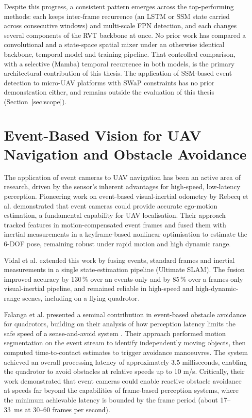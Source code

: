 \documentclass[11pt, a4paper]{report}
\begin{document}
Despite this progress, a consistent pattern emerges across the top-performing methods: each keeps inter-frame recurrence (an LSTM or SSM state carried across consecutive windows) and multi-scale FPN detection, and each changes several components of the RVT backbone at once. No prior work has compared a convolutional and a state-space spatial mixer under an otherwise identical backbone, temporal model and training pipeline. That controlled comparison, with a selective (Mamba) temporal recurrence in both models, is the primary architectural contribution of this thesis. The application of SSM-based event detection to micro-UAV platforms with SWaP constraints has no prior demonstration either, and remains outside the evaluation of this thesis (Section~\ref{sec:scope}).

\section{Event-Based Vision for UAV Navigation and Obstacle Avoidance}
The application of event cameras to UAV navigation has been an active area of research, driven by the sensor's inherent advantages for high-speed, low-latency perception. Pioneering work on event-based visual-inertial odometry by Rebecq et al. \cite{rebecq2017real} demonstrated that event cameras could provide accurate ego-motion estimation, a fundamental capability for UAV localisation. Their approach tracked features in motion-compensated event frames and fused them with inertial measurements in a keyframe-based nonlinear optimisation to estimate the 6-DOF pose, remaining robust under rapid motion and high dynamic range. 

Vidal et al. \cite{vidal2018ultimate} extended this work by fusing events, standard frames and inertial measurements in a single state-estimation pipeline (Ultimate SLAM). The fusion improved accuracy by 130\,\% over an events-only and by 85\,\% over a frames-only visual-inertial pipeline, and remained reliable in high-speed and high-dynamic-range scenes, including on a flying quadrotor. 

Falanga et al. \cite{falanga2020dynamic} presented a seminal contribution in event-based obstacle avoidance for quadrotors, building on their analysis of how perception latency limits the safe speed of a sense-and-avoid system \cite{falanga2019fast}. Their approach performed motion segmentation on the event stream to identify independently moving objects, then computed time-to-contact estimates to trigger avoidance manoeuvres. The system achieved an overall processing latency of approximately 3.5 milliseconds, enabling the quadrotor to avoid obstacles at relative speeds up to 10 m/s. Critically, their work demonstrated that event cameras could enable reactive obstacle avoidance at speeds far beyond the capabilities of frame-based perception systems, where the minimum achievable latency is bounded by the frame period (about 17--33~ms at 30--60 frames per second). 
\end{document}
